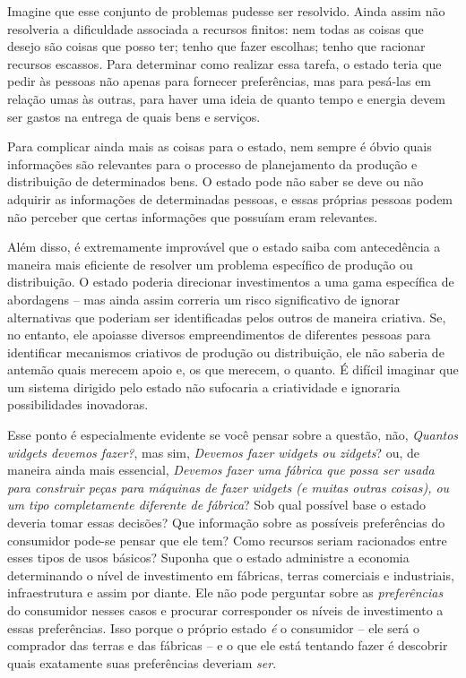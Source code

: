 Imagine que esse conjunto de problemas pudesse ser resolvido. Ainda assim não resolveria a dificuldade associada a recursos finitos: nem todas as coisas que desejo são coisas que posso ter; tenho que fazer escolhas; tenho que racionar recursos escassos. Para determinar como realizar essa tarefa, o estado teria que pedir às pessoas não apenas para fornecer preferências, mas para pesá-las em relação umas às outras, para haver uma ideia de quanto tempo e energia devem ser gastos na entrega de quais bens e serviços.

Para complicar ainda mais as coisas para o estado, nem sempre é óbvio quais informações são relevantes para o processo de planejamento da produção e distribuição de determinados bens. O estado pode não saber se deve ou não adquirir as informações de determinadas pessoas, e essas próprias pessoas podem não perceber que certas informações que possuíam eram relevantes.

Além disso, é extremamente improvável que o estado saiba com antecedência a maneira mais eficiente de resolver um problema específico de produção ou distribuição. O estado poderia direcionar investimentos a uma gama específica de abordagens -- mas ainda assim correria um risco significativo de ignorar alternativas que poderiam ser identificadas pelos outros de maneira criativa. Se, no entanto, ele apoiasse diversos empreendimentos de diferentes pessoas para identificar mecanismos criativos de produção ou distribuição, ele não saberia de antemão quais merecem apoio e, os que merecem, o quanto. É difícil imaginar que um sistema dirigido pelo estado não sufocaria a criatividade e ignoraria possibilidades inovadoras. 

Esse ponto é especialmente evidente se você pensar sobre a questão, não, \emph{Quantos widgets devemos fazer?}, mas sim, \emph{Devemos fazer widgets ou zidgets}? ou, de maneira ainda mais essencial, \emph{Devemos fazer uma fábrica que possa ser usada para construir peças para máquinas de fazer widgets (e muitas outras coisas), ou um tipo completamente diferente de fábrica}? Sob qual possível base o estado deveria tomar essas decisões? Que informação sobre as possíveis preferências do consumidor pode-se pensar que ele tem? Como recursos seriam racionados entre esses tipos de usos básicos? Suponha que o estado administre a economia determinando o nível de investimento em fábricas, terras comerciais e industriais, infraestrutura e assim por diante. Ele não pode perguntar sobre as \emph{preferências} do consumidor nesses casos e procurar corresponder os níveis de investimento a essas preferências. Isso porque o próprio estado \emph{é} o consumidor -- ele será o comprador das terras e das fábricas -- e o que ele está tentando fazer é descobrir quais exatamente suas preferências deveriam \emph{ser}.

